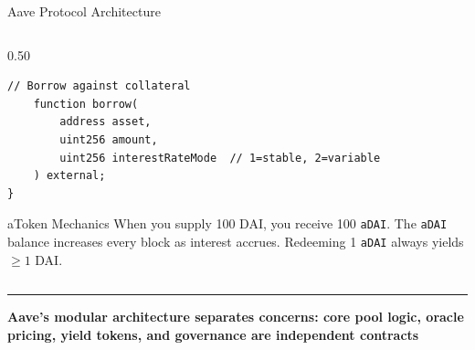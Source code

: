 \documentclass[8pt,aspectratio=169]{beamer}
\newcommand{\bottomnote}[1]{\vfill\vspace{-2mm}\textcolor{mllavender2}{\rule{\textwidth}{0.4pt}}\vspace{1mm}\footnotesize\textbf{#1}}
\begin{document}
\begin{frame}[fragile]{Aave Protocol Architecture}
\begin{columns}[T]
\begin{column}{0.50\textwidth}
\begin{lstlisting}[language=Solidity, caption={}]
    // Borrow against collateral
    function borrow(
        address asset,
        uint256 amount,
        uint256 interestRateMode  // 1=stable, 2=variable
    ) external;
}
\end{lstlisting}
      \vspace{3mm}
      \begin{block}{aToken Mechanics}
        When you supply 100 DAI, you receive 100 \texttt{aDAI}. The \texttt{aDAI} balance increases
        every block as interest accrues. Redeeming 1 \texttt{aDAI} always yields $\geq 1$ DAI.
      \end{block}
    \end{column}
  \end{columns}
  \bottomnote{Aave's modular architecture separates concerns: core pool logic, oracle pricing, yield tokens, and governance are independent contracts}
\end{frame}
\end{document}
